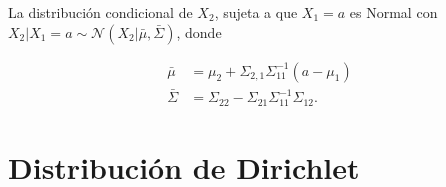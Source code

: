 \begin{prop*}
    La distribuci\'on condicional de $X_2$, sujeta a que $X_1 = a$ es Normal con $X_2|X_1=a \sim \mathcal{N}(X_2|\bar{\mu},\bar{\Sigma})$, donde
    
    \begin{equation*}
    \begin{aligned}
        \bar{\mu} &= \mu_2 + \Sigma_{2,1}\Sigma_{11}^{-1}(a-\mu_1) \\
        \bar{\Sigma} &= \Sigma_{22} - \Sigma_{21}\Sigma_{11}^{-1}\Sigma_{12}.
    \end{aligned}
    \end{equation*}
\end{prop*}

\section{Distribuci\'on de Dirichlet}

